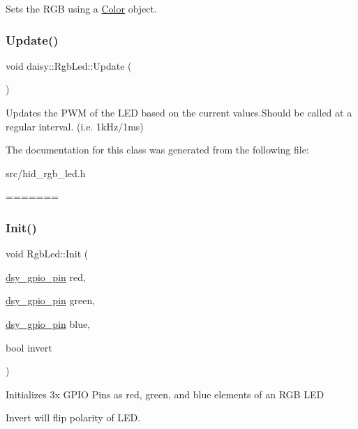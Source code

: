 Sets the R\+GB using a \hyperlink{classdaisy_1_1_color}{Color} object. \mbox{\label{classdaisy_1_1_rgb_led_a6bf7b10c72831aa2d2a7f021822f1899}} 
\subsubsection{\texorpdfstring{Update()}{Update()}}
{\footnotesize\ttfamily void daisy\+::\+Rgb\+Led\+::\+Update (\begin{DoxyParamCaption}{ }\end{DoxyParamCaption})}

Updates the P\+WM of the L\+ED based on the current values.\+Should be called at a regular interval. (i.\+e. 1k\+Hz/1ms) 

The documentation for this class was generated from the following file\+:\begin{DoxyCompactItemize}
\item 
src/hid\+\_\+rgb\+\_\+led.\+h\end{DoxyCompactItemize}
=======
\mbox{\label{classdaisy_1_1_rgb_led_aea7e214ca5f39d1df9d307b6fce4463b}} 
\subsubsection{\texorpdfstring{Init()}{Init()}}
{\footnotesize\ttfamily void Rgb\+Led\+::\+Init (\begin{DoxyParamCaption}\item[{\hyperlink{structdsy__gpio__pin}{dsy\+\_\+gpio\+\_\+pin}}]{red,  }\item[{\hyperlink{structdsy__gpio__pin}{dsy\+\_\+gpio\+\_\+pin}}]{green,  }\item[{\hyperlink{structdsy__gpio__pin}{dsy\+\_\+gpio\+\_\+pin}}]{blue,  }\item[{bool}]{invert }\end{DoxyParamCaption})}

Initializes 3x G\+P\+IO Pins as red, green, and blue elements of an R\+GB L\+ED

Invert will flip polarity of L\+ED. \mbox{\label{classdaisy_1_1_rgb_led_a36369f2837770bd4e6b8240cfdc9ce18}} 
